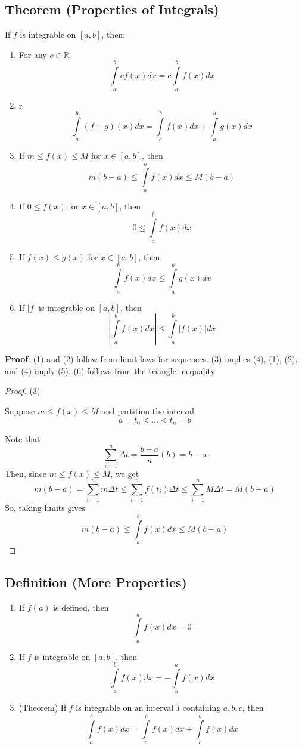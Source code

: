 \subsection{Theorem (Properties of Integrals)}
If $ f $ is integrable on $ [a,b] $, then:
\begin{enumerate}[(1)]
    \item For any $ c\in\mathbb{R} $,
    \[ \int\limits_{a}^{b} cf(x) d{x} = c \int\limits_{a}^{b} f(x) d{x} \]
    \item r
    \[ \int\limits_{a}^{b} (f+g)(x) d{x} = \int\limits_{a}^{b} f(x) d{x} + 
                                            \int\limits_{a}^{b} g(x) d{x} \]
    \item If $ m\le f(x)\le M $ for $ x\in[a,b] $, then
    \[ m(b-a)\le \int\limits_{a}^{b} f(x) d{x} \le M(b-a) \]
    \item If $ 0\le f(x) $ for $ x\in[a,b] $, then
    \[ 0\le \int\limits_{a}^{b} f(x) d{x} \]
    \item If $ f(x)\le g(x) $ for $ x\in[a,b] $, then
    \[ \int\limits_{a}^{b} f(x) d{x} \le \int\limits_{a}^{b} g(x) d{x} \]
    \item If $ |f| $ is integrable on $ [a,b] $, then
    \[ \left|\int\limits_{a}^{b} f(x) d{x}\right|\le \int\limits_{a}^{b} |f(x)| d{x} \]
\end{enumerate}

\textbf{Proof}: (1) and (2) follow from limit laws for sequences. (3) implies (4), 
(1), (2), and (4) imply (5). (6) follows from the triangle inequality

\begin{proof} (3)

    Suppose $ m\le f(x)\le M $ and partition the interval
    \[ a=t_0<\dots<t_n=b \]
    
    Note that
    \[ \sum\limits_{i=1}^{n} \Delta t=\frac{b-a}{n}(b)=b-a \]
    Then, since $ m\le f(x)\le M $, we get
    \[ m(b-a)=\sum\limits_{i=1}^{n} m\Delta t\le \sum\limits_{i=1}^{n} f(t_i)\Delta t
        \le \sum\limits_{i=1}^{n} M\Delta t=M(b-a) \]
    So, taking limits gives
    \[ m(b-a)\le \int\limits_{a}^{b} f(x) d{x} \le M(b-a) \]
\end{proof}

\subsection{Definition (More Properties)}
\begin{enumerate}[(1)]
    \item If $ f(a) $ is defined, then
    \[ \int\limits_{a}^{a} f(x) d{x} =0 \]
    \item If $ f $ is integrable on $ [a,b] $, then
    \[ \int\limits_{a}^{b} f(x) d{x}=-\int\limits_{b}^{a} f(x) d{x} \]
    \item (Theorem) If $ f $ is integrable on an interval $ I $ containing $ a,b,c $, then
    \[ \int\limits_{a}^{b} f(x) d{x}=\int\limits_{a}^{c} f(x) d{x}+\int\limits_{c}^{b} f(x) d{x} \]
\end{enumerate}

